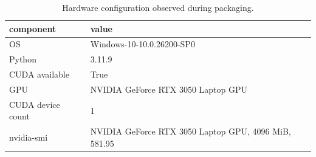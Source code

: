 \begin{table}
\caption{Hardware configuration observed during packaging.}
\label{tab:hardware_configuration_table}
\begin{tabular}{ll}
\toprule
component & value \\
\midrule
OS & Windows-10-10.0.26200-SP0 \\
Python & 3.11.9 \\
CUDA available & True \\
GPU & NVIDIA GeForce RTX 3050 Laptop GPU \\
CUDA device count & 1 \\
nvidia-smi & NVIDIA GeForce RTX 3050 Laptop GPU, 4096 MiB, 581.95 \\
\bottomrule
\end{tabular}
\end{table}
